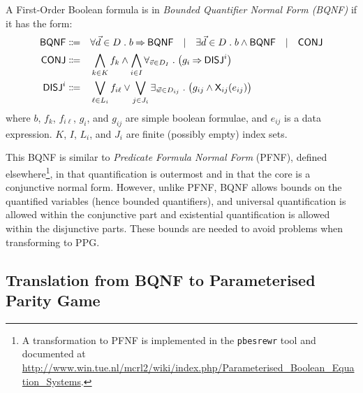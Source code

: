 \documentclass{article}
\begin{document}
\begin{definition}
A First-Order Boolean formula is in \emph{Bounded Quantifier Normal Form (BQNF)} if it has the form:
\begin{align*}
\mathsf{BQNF} \Coloneqq &\quad
    \forall {\vec{d} \in D} \mathrel{.} b \mathbin{\Rightarrow} \mathsf{BQNF}
\quad \vert \quad
    \exists {\vec{d} \in D} \mathrel{.} b \land \mathsf{BQNF}
\quad \vert \quad
    \mathsf{CONJ} \\
\mathsf{CONJ} \Coloneqq &\quad
    \bigwedge_{k \in K} f_k \land
    \bigwedge_{i \in I} \forall_{\vec{v} \in D_I} \mathrel{.} \big( g_i \mathbin{\Rightarrow} \mathsf{DISJ}^i \big) \\
\mathsf{DISJ}^i \Coloneqq &\quad
    \bigvee_{\ell \in L_i} f_{i\ell} \lor
    \bigvee_{j \in J_i} \exists_{\vec{w} \in D_{ij}} \mathrel{.} \big( g_{ij} \land \mathsf{X}_{ij}(e_{ij}) \big)
\end{align*}
where $b$, $f_k$, $f_{i\ell}$, $g_i$, and $g_{ij}$ are simple boolean formulae, and $e_{ij}$ is a data expression. 
$K$, $I$, $L_i$, and $J_i$ are finite (possibly empty) index sets.
\end{definition}

This BQNF is similar to \emph{Predicate Formula Normal Form} (PFNF), defined elsewhere\footnote{
A transformation to PFNF is implemented in the \texttt{pbesrewr} tool and documented at
\url{http://www.win.tue.nl/mcrl2/wiki/index.php/Parameterised_Boolean_Equation_Systems}.},
in that quantification is outermost and in that the core is a conjunctive normal form. 
However, unlike PFNF, BQNF allows bounds on the quantified variables (hence bounded quantifiers), and universal quantification
is allowed within the conjunctive part and existential quantification is allowed within the disjunctive parts.
These bounds are needed to avoid problems when transforming to PPG. 



\subsection{Translation from BQNF to Parameterised Parity Game}
\end{document}

